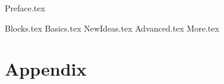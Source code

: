 \documentclass[
    twoside,
]{styles/mori-book}%
\begin{document}
    \maketitlepage

    \frontmatter
    \pagestyle{front}
    {Preface.tex}

    \maketocpage

    \mainmatter

    \pagestyle{main}

    {Blocks.tex}
    {Basics.tex}
    {NewIdeas.tex}
    {Advanced.tex}
    {More.tex}

    \setcounter{part}{4}

    \appendix
    \section{Appendix}

    \backmatter


    \lipsum[2-3]
    \printindex
    \printnomenclature
    \printbibliography
    
\end{document}
